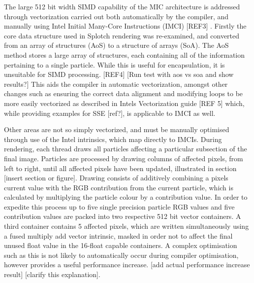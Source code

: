 \documentclass{easychair}
\begin{document}
The large 512 bit width SIMD capability of the MIC architecture is addressed through vectorization carried out both 
automatically by the compiler, and manually using Intel Initial Many-Core Instructions (IMCI) [REF3] . Firstly the 
core data structure used in Splotch rendering was re-examined, and converted from an array of structures (AoS) to 
a structure of arrays (SoA). The AoS method stores a large array of structures, each containing all of the 
information pertaining to a single particle. While this is useful for encapsulation, it is unsuitable for SIMD 
processing. [REF4] [Run test with aos vs soa and show results?] This aids the compiler in automatic vectorization, 
amongst other changes such as ensuring the correct data alignment and modifying loops to be more easily vectorized 
as described in Intels Vectorization guide [REF 5] which, while providing examples for SSE [ref?], is applicable 
to IMCI as well. 

Other areas are not so simply vectorized, and must be manually optimised through use of the Intel intrinsics, 
which map directly to IMCIs. During rendering, each thread draws all particles affecting a particular subsection 
of the final image. Particles are processed by drawing columns of affected pixels, from left to right, until all 
affected pixels have been updated, illustrated in section [insert section or figure]. Drawing consists of additively 
combining a pixels current value with the RGB contribution from the current particle, which is calculated by 
multiplying the particle colour by a contribution value. In order to expedite this process up to five single 
precision particle RGB values and five contribution values are packed into two respective 512 bit vector containers. 
A third container contains 5 affected pixels, which are written simultaneously using a fused multiply add vector 
intrinsic, masked in order not to affect the final unused float value in the 16-float capable containers. A 
complex optimisation such as this is not likely to automatically occur during compiler optimisation, however 
provides a useful performance increase. [add actual performance increase result] [clarify this explanation].
\end{document}
